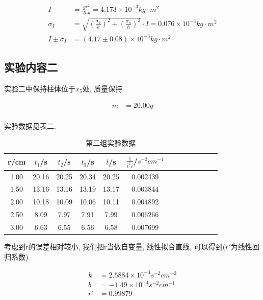 \documentclass[a4paper,12pt,notitlepage]{article}
\begin{document}
\begin{align*}
	I &= \frac{gr^2}{2hk} = 4.173\times 10^{-3} kg \cdot m^2 \\
	\sigma_I &= \sqrt{(\frac{\sigma_k}{k})^2+(\frac{\sigma_h}{h})^2} \cdot I =  0.076 \times 10^{-3} kg\cdot m^2 \\
	I \pm \sigma_I &= (4.17 \pm 0.08) \times 10^{-3} kg\cdot m^2
\end{align*}

\subsection{实验内容二}

	实验二中保持柱体位于$x_5$处, 质量保持
	
\begin{align*}
	m &= 20.00 g \\
\end{align*}

	实验数据见表二. \\
	
\begin{center}
	\begin{longtable}{|c|c|c|c|c|c|c|c|c|c|c|c|c|}

	\caption{第二组实验数据}	\\
	\hline
	r/cm & $t_1$/s & $t_2$/s & $t_3$/s & $\bar{t}$/s & $\frac{1}{\bar{t}^2r}$/$s^{-2}cm^{-1}$ \\
	\hline
	1.00 & 20.16 & 20.25 & 20.34 & 20.25 & 0.002439 \\
	\hline
	1.50 & 13.16 & 13.16 & 13.19 & 13.17 & 0.003844 \\
	\hline
	2.00 & 10.18 & 10.09 & 10.06 & 10.11 & 0.004892 \\
	\hline
	2.50 & 8.09 & 7.97 & 7.91 & 7.99 & 0.006266 \\
	\hline
	3.00 & 6.63 & 6.55 & 6.56 & 6.58 & 0.007699 \\
	\hline

	\end{longtable}
\end{center}
	
	考虑到r的误差相对较小, 我们把r当做自变量, 线性拟合直线, 可以得到($r'$为线性回归系数)
	
\begin{align*}
	k &= 2.5884 \times 10^{-3} s^{-2}cm^{-2} \\
	b &= -1.49 \times 10^{-4} s^{-2}cm^{-1} \\
	r' &= 0.99879
\end{align*}
\end{document}
